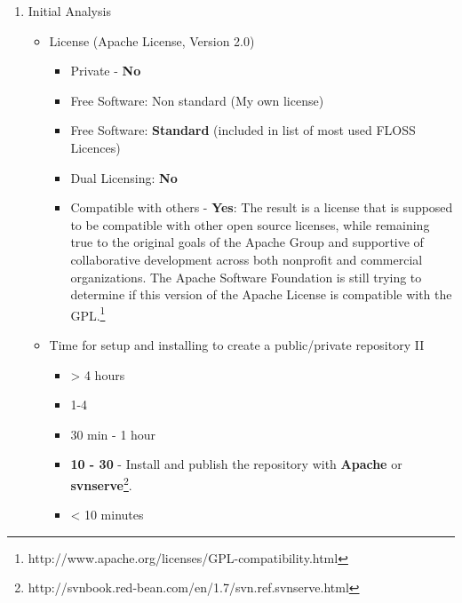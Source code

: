 \documentclass[11pt]{scrartcl}
\begin{document}
\begin{enumerate}
    \item Initial Analysis
    \begin{itemize}
        \item License (Apache License, Version 2.0)
        \begin{itemize} 
            \item Private - \textbf{No}
            \item Free Software: Non standard (My own license)
            \item Free Software: \textbf{Standard} (included in list of most used FLOSS Licences)
            \item Dual Licensing: \textbf{No}
            \item Compatible with others - \textbf{Yes}: The result is a license that is supposed to be compatible with other open source licenses, while remaining true to the original goals of the Apache Group and supportive of collaborative development across both nonprofit and commercial organizations. The Apache Software Foundation is still trying to determine if this version of the Apache License is compatible with the GPL.\footnote{http://www.apache.org/licenses/GPL-compatibility.html}    
        \end{itemize}
	    \item Time for setup and installing to create a public/private repository II
        \begin{itemize}
            \item \textgreater
 4 hours
            \item 1-4 
            \item 30 min - 1 hour
            \item \textbf{10 - 30} - Install and publish the repository with \textbf{Apache} or \textbf{svnserve}\footnote{http://svnbook.red-bean.com/en/1.7/svn.ref.svnserve.html}.
            \item \textless
 10 minutes
        \end{itemize}
    \end{itemize}


\end{enumerate}
\end{document}
